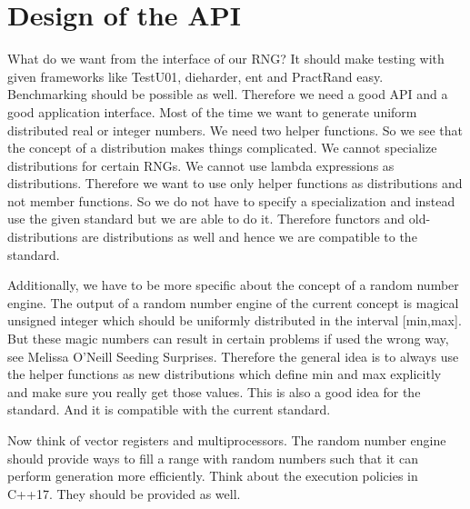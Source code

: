 \documentclass{stdlocal}
\begin{document}
\section{Design of the API} %
\label{sec:design_of_the_api}

  What do we want from the interface of our RNG?
  It should make testing with given frameworks like TestU01, dieharder, ent and PractRand easy.
  Benchmarking should be possible as well.
  Therefore we need a good API and a good application interface.
  Most of the time we want to generate uniform distributed real or integer numbers.
  We need two helper functions.
  So we see that the concept of a distribution makes things complicated.
  We cannot specialize distributions for certain RNGs.
  We cannot use lambda expressions as distributions.
  Therefore we want to use only helper functions as distributions and not member functions.
  So we do not have to specify a specialization and instead use the given standard but we are able to do it.
  Therefore functors and old-distributions are distributions as well and hence we are compatible to the standard.

  Additionally, we have to be more specific about the concept of a random number engine.
  The output of a random number engine of the current concept is magical unsigned integer which should be uniformly distributed in the interval [min,max].
  But these magic numbers can result in certain problems if used the wrong way, see Melissa O'Neill Seeding Surprises.
  Therefore the general idea is to always use the helper functions as new distributions which define min and max explicitly and make sure you really get those values.
  This is also a good idea for the standard.
  And it is compatible with the current standard.

  Now think of vector registers and multiprocessors.
  The random number engine should provide ways to fill a range with random numbers such that it can perform generation more efficiently.
  Think about the execution policies in C++17.
  They should be provided as well.
\end{document}
